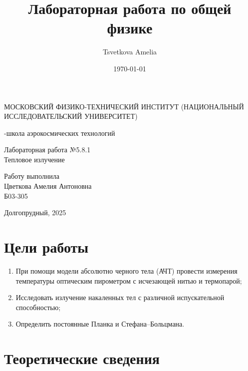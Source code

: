 \documentclass[a4paper,12pt]{article}
\author{Tsvetkova Amelia}
\title{Лабораторная работа по общей физике}
\date{\today}
\begin{document}
\begin{titlepage}
    \newpage
    \begin{center}
    {\large МОСКОВСКИЙ ФИЗИКО-ТЕХНИЧЕСКИЙ ИНСТИТУТ (НАЦИОНАЛЬНЫЙ ИССЛЕДОВАТЕЛЬСКИЙ УНИВЕРСИТЕТ)}
    \vspace{1cm}

    {-школа аэрокосмических технологий}
    \vspace{6em}
    \end{center}
    
    \vspace{1.2em}

    \begin{center}
    \Large Лабораторная работа №5.8.1 \\
    Тепловое излучение
    \linebreak
    \end{center}
    
    \vspace{11em}
    
    \begin{flushright}
                       {\large Работу выполнила\\
                       Цветкова Амелия Антоновна\\
                       Б03-305 }
    \end{flushright}

    \vspace{\fill}

    \begin{center}
    Долгопрудный, 2025
    \end{center}

    \end{titlepage}

\section{Цели работы}
\begin{enumerate}
    \item При помощи модели абсолютно черного тела (АЧТ) провести измерения температуры оптическим пирометром с исчезающей нитью и термопарой;
    \item Исследовать излучение накаленных тел с различной испускательной способностью;
    \item Определить постоянные Планка и Стефана–Больцмана.
\end{enumerate}

\section{Теоретические сведения}
\end{document}
